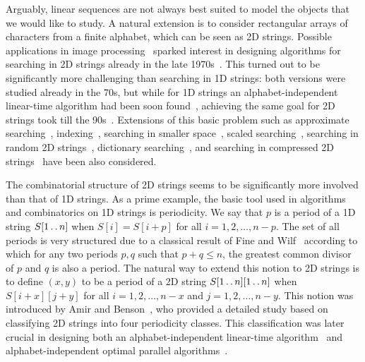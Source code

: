 \documentclass[11pt,letterpaper]{article}
\def\dd{\mathinner{.\,.}}
\begin{document}
Arguably, linear sequences are not always best suited to model the objects that we would like to study.
A natural extension is to consider rectangular arrays of characters from a finite alphabet, which can be seen as 2D strings.
Possible applications in image processing~\cite{RosenfeldKak82} sparked interest in designing algorithms
for searching in 2D strings already in the late 1970s~\cite{Baker78a,Bird77}.
This turned out to be significantly more challenging than searching in 1D strings: both versions were
studied already in the 70s, but while for 1D strings an alphabet-independent linear-time algorithm
had been soon found~\cite{DBLP:journals/siamcomp/KnuthMP77}, achieving the same goal for
2D strings took till the 90s~\cite{DBLP:journals/siamcomp/AmirBF94,GalilP96,DBLP:conf/latin/CrochemoreR95}.
Extensions of this basic problem such as approximate searching~\cite{DBLP:journals/iandc/AmirF95,DBLP:conf/spire/CliffordFSV16}, indexing~\cite{DBLP:journals/siamcomp/Giancarlo95,DBLP:conf/icalp/GiancarloG95,DBLP:journals/ipl/ChoiL97}, searching in smaller space~\cite{CrochemoreGPR95},
scaled searching~\cite{DBLP:journals/algorithmica/AmirBLP09,DBLP:journals/algorithmica/AmirC10},
searching in random 2D strings~\cite{DBLP:journals/siamcomp/KarkkainenU99},
dictionary searching~\cite{DBLP:journals/ipl/AmirF92,DBLP:journals/algorithmica/NeuburgerS13,DBLP:journals/iandc/IduryS95}, and
searching in compressed 2D strings~\cite{DBLP:journals/jal/AmirBF97,DBLP:journals/jal/AmirLS03,DBLP:conf/dcc/AmirB92}
have been also considered.

The combinatorial structure of 2D strings seems to be significantly more involved than that of 1D strings.
As a prime example, the basic tool used in algorithms and combinatorics on 1D strings is periodicity.
We say that $p$ is a period of a 1D string $S[1\dd n]$ when $S[i]=S[i+p]$ for all $i=1,2,\ldots,n-p$.
The set of all periods is very structured due to a classical result of Fine and Wilf~\cite{fine1965uniqueness}
according to which for any two periods $p,q$ such that $p+q\leq n$, the greatest common divisor of
$p$ and $q$ is also a period. The natural way to extend this notion to 2D strings is to define
$(x,y)$ to be a period of a 2D string $S[1 \dd n][1 \dd n]$ when $S[i+x][j+y]$ for all $i=1,2,\ldots,n-x$ and $j=1,2,\ldots,n-y$.
This notion was introduced by Amir and Benson~\cite{AmirB98}, who provided a detailed study
based on classifying 2D strings into four periodicity classes.
This classification was later crucial in designing both an alphabet-independent linear-time
algorithm~\cite{GalilP96,DBLP:conf/latin/CrochemoreR95} and alphabet-independent optimal parallel
algorithms~\cite{DBLP:journals/siamcomp/CrochmoreGHMR98,DBLP:journals/iandc/AmirBF98}.
\end{document}
